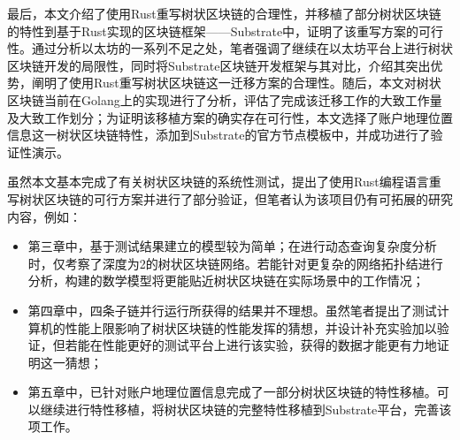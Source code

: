 \begin{conclusion}
  最后，本文介绍了使用Rust重写树状区块链的合理性，并移植了部分树状区块链的特性到基于Rust实现的区块链框架——Substrate中，证明了该重写方案的可行性。通过分析以太坊的一系列不足之处，笔者强调了继续在以太坊平台上进行树状区块链开发的局限性，同时将Substrate区块链开发框架与其对比，介绍其突出优势，阐明了使用Rust重写树状区块链这一迁移方案的合理性。随后，本文对树状区块链当前在Golang上的实现进行了分析，评估了完成该迁移工作的大致工作量及大致工作划分；为证明该移植方案的确实存在可行性，本文选择了账户地理位置信息这一树状区块链特性，添加到Substrate的官方节点模板中，并成功进行了验证性演示。

虽然本文基本完成了有关树状区块链的系统性测试，提出了使用Rust编程语言重写树状区块链的可行方案并进行了部分验证，但笔者认为该项目仍有可拓展的研究内容，例如：

\begin{itemize}
  \item 第三章中，基于测试结果建立的模型较为简单；在进行动态查询复杂度分析时，仅考察了深度为2的树状区块链网络。若能针对更复杂的网络拓扑结进行分析，构建的数学模型将更能贴近树状区块链在实际场景中的工作情况；
  \item 第四章中，四条子链并行运行所获得的结果并不理想。虽然笔者提出了测试计算机的性能上限影响了树状区块链的性能发挥的猜想，并设计补充实验加以验证，但若能在性能更好的测试平台上进行该实验，获得的数据才能更有力地证明这一猜想；
  \item 第五章中，已针对账户地理位置信息完成了一部分树状区块链的特性移植。可以继续进行特性移植，将树状区块链的完整特性移植到Substrate平台，完善该项工作。
\end{itemize}

\end{conclusion}
